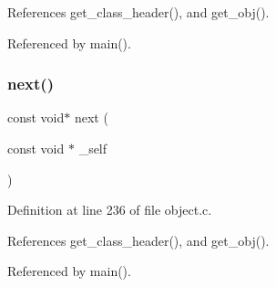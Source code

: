 References get\+\_\+class\+\_\+header(), and get\+\_\+obj().



Referenced by main().

\mbox{\label{group__collection_gaecc46e74b03a83ca8a8023cc7264489c}} 
\subsubsection{\texorpdfstring{next()}{next()}}
{\footnotesize\ttfamily const void$\ast$ next (\begin{DoxyParamCaption}\item[{const void $\ast$}]{\+\_\+self }\end{DoxyParamCaption})}



Definition at line 236 of file object.\+c.



References get\+\_\+class\+\_\+header(), and get\+\_\+obj().



Referenced by main().

